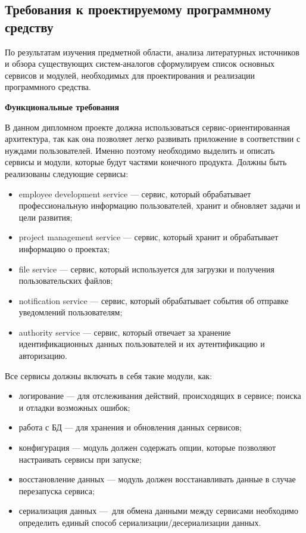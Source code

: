 \subsection{Требования к проектируемому программному средству}\label{sec:analysis:specification}

По результатам изучения предметной области, анализа литературных источников и обзора существующих систем-аналогов сформулируем список основных сервисов и модулей, необходимых для проектирования и реализации программного средства.

\bigskip
\textbf{Функциональные требования}

В данном дипломном проекте должна использоваться сервис-ориенти\-рованная архитектура, так как она позволяет легко развивать приложение в соответствии с нуждами пользователей. Именно поэтому необходимо выделить и описать сервисы и модули, которые будут частями конечного продукта. Должны быть реализованы следующие сервисы:
\begin{itemize}
    \item employee development service — сервис, который обрабатывает профессиональную информацию пользователей, хранит и обновляет задачи и цели развития;
    \item project management service — сервис, который хранит и обрабатывает информацию о проектах;
    \item file service — сервис, который используется для загрузки и получения пользовательских файлов;
    \item notification service — сервис, который обрабатывает события об отправке уведомлений пользователям;
    \item authority service — сервис, который отвечает за хранение идентификационных данных пользователей и их аутентификацию и авторизацию.
\end{itemize}

Все сервисы должны включать в себя такие модули, как:
\begin{itemize}
    \item логирование — для отслеживания действий, происходящих в сервисе; поиска и отладки возможных ошибок;
    \item работа с БД — для хранения и обновления данных сервисов;
    \item конфигурация — модуль должен содержать опции, которые позволяют настраивать сервисы при запуске;
    \item восстановление данных — модуль должен восстанавливать данные в случае перезапуска сервиса;
    \item сериализация данных — для обмена данными между сервисами необходимо определить единый способ сериализации/десериализации данных.
\end{itemize}

